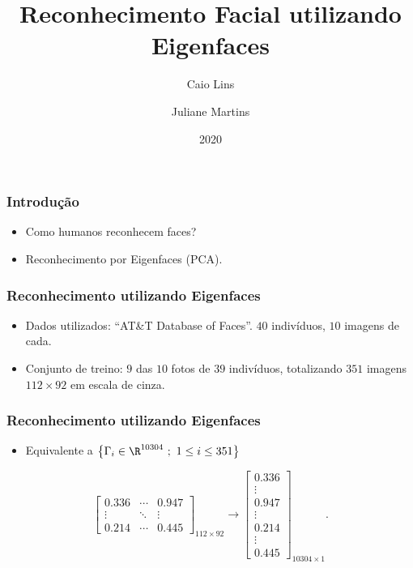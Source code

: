 \documentclass[15pt]{beamer}
\title[Eigenfaces]{Reconhecimento Facial utilizando Eigenfaces}
\author[C. Lins, J. Martins]{Caio Lins \and Juliane Martins}
\institute[EMAp]{FGV - EMAp}
\date[EMAp 2020]{2020}
\begin{document}
\frame{\titlepage}

\begin{frame}
    \frametitle{Introdução}

    \begin{itemize}
        \item<1-> Como humanos reconhecem faces?

        \item<2-> Reconhecimento por Eigenfaces (PCA).
    \end{itemize}

\end{frame}


\begin{frame}
    \frametitle{Reconhecimento utilizando Eigenfaces}

    \begin{itemize}
        \item<1-> Dados utilizados: ``AT\&T Database of Faces''\cite{att}.
        \( 40 \) indivíduos, \( 10 \) imagens de cada.
        \item<2-> Conjunto de treino: \( 9 \) das \( 10 \) fotos de \( 39 \) indivíduos, totalizando \( 351 \) imagens \( 112 \times 92 \) em escala de cinza.
         
    \end{itemize}

\end{frame}

\begin{frame}
    \frametitle{Reconhecimento utilizando Eigenfaces}

    \begin{itemize}
        \item Equivalente a \( \left\{ \Gamma_{ i } \in \R^{ 10304 } \ ; \ 1 \leq i \leq 351 \right\} \)
    \end{itemize}
    
    \pause\bigskip

    \[
        \begin{bmatrix}
            0.336 & \cdots & 0.947 \\
            \vdots & \ddots & \vdots \\
            0.214 & \cdots & 0.445
        \end{bmatrix}_{ 112\times92 }
        \longrightarrow
        \begin{bmatrix}
            0.336 \\
            \vdots \\
            0.947 \\
            \vdots \\
            0.214 \\
            \vdots \\
            0.445
        \end{bmatrix}_{ 10304\times1 }
    .\]
\end{frame}
\end{document}
